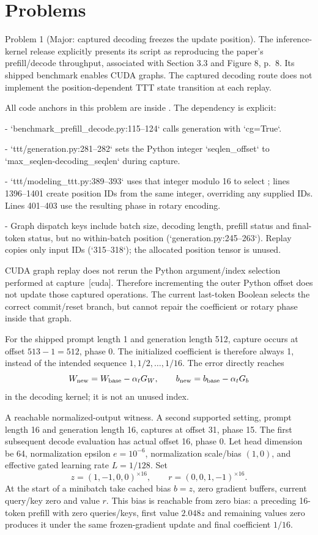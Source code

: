\documentclass[10pt]{article}
\begin{document}
\section*{Problems}
Problem 1 (Major: captured decoding freezes the update position).  The inference-kernel release explicitly presents its script as reproducing the paper’s prefill/decode throughput, associated with Section 3.3 and Figure 8, p. 8. Its shipped benchmark enables CUDA graphs. The captured decoding route does not implement the position-dependent TTT state transition at each replay.\par
All code anchors in this problem are inside . The dependency is explicit:\par
- `benchmark\_prefill\_decode.py:115--124` calls generation with `cg=True`.\par
- `ttt/generation.py:281--282` sets the Python integer `seqlen\_offset` to `max\_seqlen-decoding\_seqlen` during capture.\par
- `ttt/modeling\_ttt.py:389--393` uses that integer modulo 16 to select ; lines 1396–1401 create position IDs from the same integer, overriding any supplied IDs. Lines 401–403 use the resulting phase in rotary encoding.\par
- Graph dispatch keys include batch size, decoding length, prefill status and final-token status, but no within-batch position (`generation.py:245--263`). Replay copies only input IDs (`315--318`); the allocated position tensor is unused.\par
CUDA graph replay does not rerun the Python argument/index selection performed at capture [cuda]. Therefore incrementing the outer Python offset does not update those captured operations. The current last-token Boolean selects the correct commit/reset branch, but cannot repair the coefficient or rotary phase inside that graph.\par
For the shipped prompt length 1 and generation length 512, capture occurs at offset \(513-1=512\), phase 0. The initialized coefficient is therefore always 1, instead of the intended sequence \(1,1/2,\ldots,1/16\). The error directly reaches \[W_{\rm new}=W_{\rm base}-\alpha_tG_W,\qquad
 b_{\rm new}=b_{\rm base}-\alpha_tG_b\] in the decoding kernel; it is not an unused index.\par
A reachable normalized-output witness. A second supported setting, prompt length 16 and generation length 16, captures at offset 31, phase 15. The first subsequent decode evaluation has actual offset 16, phase 0. Let head dimension be 64, normalization epsilon \(e=10^{-6}\), normalization scale/bias \((1,0)\), and effective gated learning rate \(L=1/128\). Set \[z=(1,-1,0,0)^{\times16},\qquad
 r=(0,0,1,-1)^{\times16}.\] At the start of a minibatch take cached bias \(b=z\), zero gradient buffers, current query/key zero and value \(r\). This bias is reachable from zero bias: a preceding 16-token prefill with zero queries/keys, first value \(2.048z\) and remaining values zero produces it under the same frozen-gradient update and final coefficient \(1/16\).\par
\end{document}
